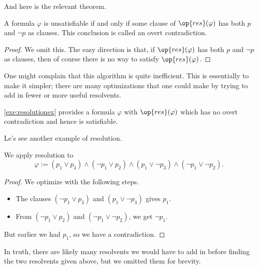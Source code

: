 \documentclass[../notes.tex]{subfiles}
\begin{document}
And here is the relevant theorem.
\begin{theorem}
	A formula $\varphi$ is unsatisfiable if and only if some clause of $\op{res}(\varphi)$ has both $p$ and $\lnot p$ as clauses. This conclusion is called an overt contradiction.
\end{theorem}
\begin{proof}
	We omit this. The easy direction is that, if $\op{res}(\varphi)$ has both $p$ and $\lnot p$ as clauses, then of course there is no way to satisfy $\op{res}(\varphi)$.
\end{proof}
\begin{remark}
	One might complain that this algorithm is quite inefficient. This is essentially to make it simpler; there are many optimizations that one could make by trying to add in fewer or more useful resolvents.
\end{remark}
\begin{example}
	\autoref{exe:resolutionex} provides a formula $\varphi$ with $\op{res}(\varphi)$ which has no overt contradiction and hence is satisfiable.
\end{example}
Le's see another example of resolution.
\begin{exe}
	We apply resolution to
	\[\varphi:=(p_1\lor p_3)\land(\lnot p_1\lor p_2)\land(p_1\lor\lnot p_3)\land(\lnot p_1\lor\lnot p_2).\]
\end{exe}
\begin{proof}
	We optimize with the following steps.
	\begin{itemize}
		\item The clauses $(\lnot p_1\lor p_3)$ and $(p_1\lor\lnot p_3)$ gives $p_1$.
		\item From $(\lnot p_1\lor p_2)$ and $(\lnot p_1\lor\lnot p_2)$, we get $\lnot p_1$.
	\end{itemize}
	But earlier we had $p_1$, so we have a contradiction.
\end{proof}
In truth, there are likely many resolvents we would have to add in before finding the two resolvents given above, but we omitted them for brevity.
\end{document}
